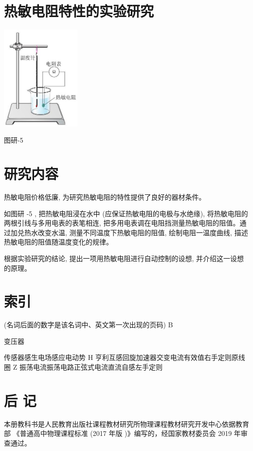 \documentclass[10pt]{article}
\begin{document}
\section*{热敏电阻特性的实验研究}

\begin{center}
\includegraphics[max width=0.3\textwidth]{images/01910e72-c5b7-7ed5-a6d4-fb3a5faefc32_119_417033.jpg}
\end{center}

图研-5

\section*{研究内容}

热敏电阻价格低廉, 为研究热敏电阻的特性提供了良好的器材条件。

如图研 -5 , 把热敏电阻浸在水中 (应保证热敏电阻的电极与水绝缘), 将热敏电阻的两根引线与多用电表的表笔相连, 把多用电表调在电阻挡测量热敏电阻的阻值。通过加兑热水改变水温, 测量不同温度下热敏电阻的阻值, 绘制电阻一温度曲线, 描述热敏电阻的阻值随温度变化的规律。

根据实验研究的结论, 提出一项用热敏电阻进行自动控制的设想, 并介绍这一设想的原理。

\section*{索引}

(名词后面的数字是该名词中、英文第一次出现的页码) B

变压器

传感器感生电场感应电动势 H 亨利互感回旋加速器交变电流有效值右手定则原线圈 Z 振荡电流振荡电路正弦式电流直流自感左手定则

\section*{后 记}

本册教科书是人民教育出版社课程教材研究所物理课程教材研究开发中心依据教育部 《普通高中物理课程标准 (2017 年版 )》编写的，经国家教材委员会 2019 年审查通过。
\end{document}
